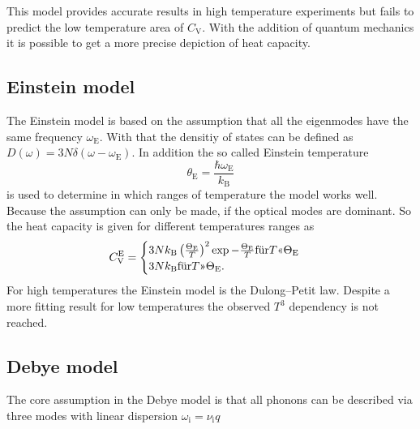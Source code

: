 This model provides accurate results in high temperature experiments but fails to predict the low temperature area of $C_\text{V}$.
With the addition of quantum mechanics it is possible to get a more precise depiction of heat capacity.


\subsection{Einstein model}
\label{ssec:theory3}

The Einstein model is based on the assumption that all the eigenmodes have the same frequency $\omega_\text{E}$.
With that the densitiy of states can be defined as $D (\omega) = 3 N \delta (\omega - \omega_\text{E})$.
In addition the so called Einstein temperature 
\begin{equation}
    \theta_\text{E} = \frac{\hbar \omega_\text{E}}{k_\text{B}}
    \label{eq:einstein}
\end{equation}
is used to determine in which ranges of temperature the model works well.
Because the assumption can only be made, if the optical modes are dominant.
So the heat capacity is given for different temperatures ranges as
\begin{equation}
    C_\text{V}^\text{E} =
      \begin{cases}
        3 N k_\text{B} \left( \frac{\Theta_\text{E}}{T}   \right)^2 \exp{- \frac{\Theta_\text{E}}{T}} \text{für} T $<<$ \Theta_\text{E}\\
        3 N k_\text{B} \text{für} T $>>$ \Theta_\text{E}.\\
        \end{cases}       
\end{equation}
For high temperatures the Einstein model is the Dulong–Petit law.
Despite a more fitting result for low temperatures the observed $T^3$ dependency is not reached.

\subsection{Debye model}
\label{ssec:theory4}

The core assumption in the Debye model is that all phonons can be described via three modes with linear dispersion $\omega_\text{i} = \nu_\text{i} q$
